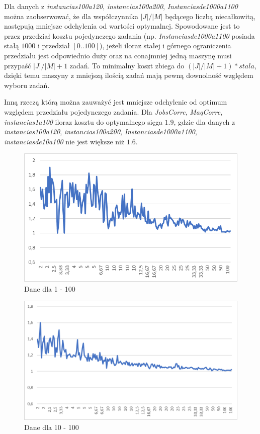 Dla danych z \textit{instancias100a120}, \textit{instancias100a200}, \textit{Instanciasde1000a1100} 
można zaobserwować, że dla współczynnika $|J|/|M|$ będącego liczbą niecałkowitą, następują mniejsze odchylenia od 
wartości optymalnej. Spowodowane jest to przez przedział kosztu pojedynczego zadania
(np. \textit{Instanciasde1000a1100} posiada stałą $1000$ i przedział $[0..100]$), jeżeli iloraz 
stałej i górnego ograniczenia przedziału jest odpowiednio duży oraz na conajmniej jedną maszynę musi
 przypaść $|J|/|M| + 1$ zadań. To minimalny koszt zbiega do $(|J|/|M| + 1) * stala $, 
dzięki temu maszyny z mniejszą ilością zadań mają pewną downolność względem wyboru zadań. 

Inną rzeczą którą można zauważyć jest mniejsze odchylenie od optimum względem przedziału pojedynczego zadania. 
Dla \textit{JobsCorre}, \textit{MaqCorre}, \textit{instancias1a100} iloraz kosztu do optymalnego sięga $1.9$, gdzie dla danych
z \textit{instancias100a120}, \textit{instancias100a200}, \textit{Instanciasde1000a1100}, \textit{instanciasde10a100} nie jest większe niż 
$1.6$.


\begin{figure}[h]
    \centering
    \includegraphics[scale=0.4]{1a100.png}
    \caption{Dane dla 1 - 100}
    \label{1-100}
\end{figure}

\begin{figure}[h]
    \centering
    \includegraphics[scale=0.33]{10a100.png}
    \caption{Dane dla 10 - 100}
    \label{10-100}
\end{figure}

